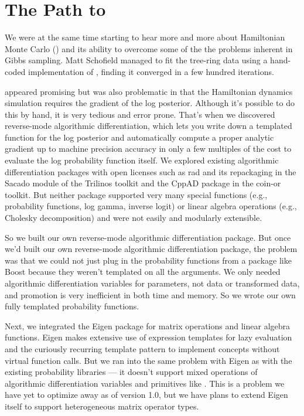 \section*{The Path to \Stan}

We were at the same time starting to hear more and more about
Hamiltonian Monte Carlo (\HMC) and its ability to overcome some of the
the problems inherent in Gibbs sampling.  Matt Schofield managed to
fit the tree-ring data using a hand-coded implementation of \HMC,
finding it converged in a few hundred iterations.

\HMC appeared promising but was also problematic in that the
Hamiltonian dynamics simulation requires the gradient of the log
posterior.  Although it's possible to do this by hand, it is very
tedious and error prone.  That's when we discovered reverse-mode
algorithmic differentiation, which lets you write down a templated
\Cpp function for the log posterior and automatically compute a proper
analytic gradient up to machine precision accuracy in only a few
multiples of the cost to evaluate the log probability function itself.
We explored existing algorithmic differentiation packages with open
licenses such as {\sc rad} \citep{Gay:2005} and its repackaging in the
Sacado module of the Trilinos toolkit and the {\small CppAD} package in the
{\sc coin-or} toolkit.  But neither package supported very many
special functions (e.g., probability functions, log gamma, inverse logit) or
linear algebra operations (e.g., Cholesky decomposition) and were not
easily and modularly extensible.  

So we built our own reverse-mode algorithmic differentiation package.
But once we'd built our own reverse-mode algorithmic differentiation
package, the problem was that we could not just plug in the
probability functions from a package like Boost because they weren't
templated on all the arguments.  We only needed algorithmic
differentiation variables for parameters, not data or transformed
data, and promotion is very inefficient in both time and memory.  So
we wrote our own fully templated probability functions.  

Next, we integrated the Eigen \Cpp package for matrix operations and
linear algebra functions.  Eigen makes extensive use of expression
templates for lazy evaluation and the curiously recurring template
pattern to implement concepts without virtual function calls.  But we
ran into the same problem with Eigen as with the existing probability
libraries --- it doesn't support mixed operations of algorithmic
differentiation variables and primitives like .  This is
a problem we have yet to optimize away as of \Stan version 1.0, but we
have plans to extend Eigen itself to support heterogeneous 
matrix operator types.

